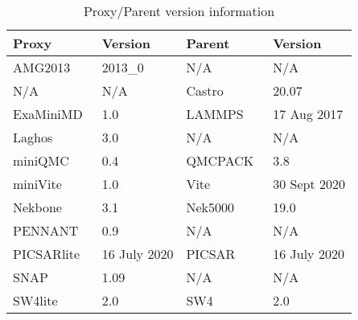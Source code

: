 \begin{table}[!t]
\scriptsize
\caption{Proxy/Parent version information}
\label{tab:versions}
\centering
\begin{tabular}{ll|ll}
\toprule
\textbf{Proxy}                                  & \textbf{Version}                          & \textbf{Parent}                       & \textbf{Version}                           \\ 
\midrule
AMG2013~\cite{AMG}                    & \cellcolor{Gray!50}2013\_0       & N/A                                         & \cellcolor{Gray!50}N/A                 \\
N/A                                                 & \cellcolor{Gray!50}N/A               & Castro~\cite{Castro}               & \cellcolor{Gray!50}20.07              \\
ExaMiniMD~\cite{ostiExaMiniMD}        & \cellcolor{Gray!50}1.0               & LAMMPS~\cite{LAMMPS}      & \cellcolor{Gray!50}17 Aug 2017   \\
Laghos~\cite{Laghos}                     & \cellcolor{Gray!50}3.0               & N/A                                          & \cellcolor{Gray!50}N/A                  \\
miniQMC~\cite{richards2018fy18}  & \cellcolor{Gray!50}0.4               & QMCPACK~\cite{qmcpack}    & \cellcolor{Gray!50}3.8                  \\
miniVite~\cite{miniVite}                    & \cellcolor{Gray!50}1.0               & Vite~\cite{Vite}                        & \cellcolor{Gray!50} 30 Sept 2020  \\
Nekbone~\cite{nekbone}                 & \cellcolor{Gray!50} 3.1               & Nek5000~\cite{Nek5000}        & \cellcolor{Gray!50}19.0                 \\
PENNANT~\cite{pennant}               & \cellcolor{Gray!50}0.9                & N/A                                          & \cellcolor{Gray!50} N/A                 \\
PICSARlite~\cite{picsarlite}             &\cellcolor{Gray!50}16 July 2020  & PICSAR~\cite{PICSAR}         & \cellcolor{Gray!50}16 July 2020    \\
SNAP~\cite{snap}                            & \cellcolor{Gray!50}1.09              & N/A                                          & \cellcolor{Gray!50}N/A                  \\
SW4lite~\cite{ECPProxySuite1}        & \cellcolor{Gray!50}2.0                & SW4~\cite{SW42}                  & \cellcolor{Gray!50}2.0                    \\

\end{tabular}
\end{table}
